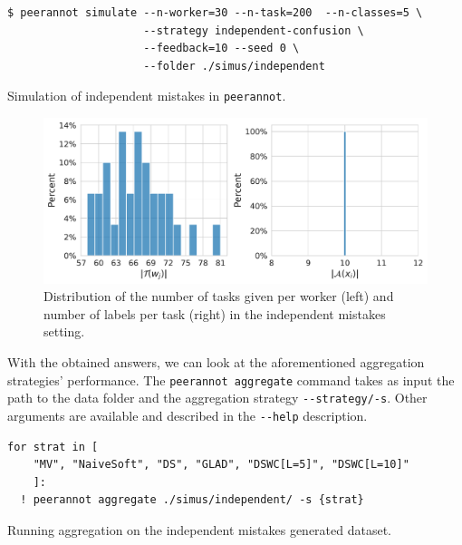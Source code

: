 \begin{listing}[H]
    \begin{verbatim}
$ peerannot simulate --n-worker=30 --n-task=200  --n-classes=5 \
                     --strategy independent-confusion \
                     --feedback=10 --seed 0 \
                     --folder ./simus/independent
    \end{verbatim}
    \caption{Simulation of independent mistakes in \texttt{peerannot}.}
    \label{lst:indep_mistakes}
\end{listing}

\begin{figure}[tbh]
    \centering
    \includegraphics[width=\textwidth]{./images_peerannot/fig-simu1-output-1.pdf}
    \caption{Distribution of the number of tasks given per worker (left) and number of labels per task (right) in the independent mistakes setting.}
    \label{fig:desc_independent}
\end{figure}

With the obtained answers, we can look at the aforementioned aggregation strategies' performance. The \texttt{peerannot aggregate} command takes as input the path to the data folder and the aggregation strategy \texttt{-{}-strategy/-s}. Other arguments are available and described in the \texttt{-{}-help} description.

\begin{listing}[H]
    \begin{verbatim}
for strat in [
    "MV", "NaiveSoft", "DS", "GLAD", "DSWC[L=5]", "DSWC[L=10]"
    ]:
  ! peerannot aggregate ./simus/independent/ -s {strat}
    \end{verbatim}
    \caption{Running aggregation on the independent mistakes generated dataset.}
    \label{lst:indep_mistakes_agg}
\end{listing}

